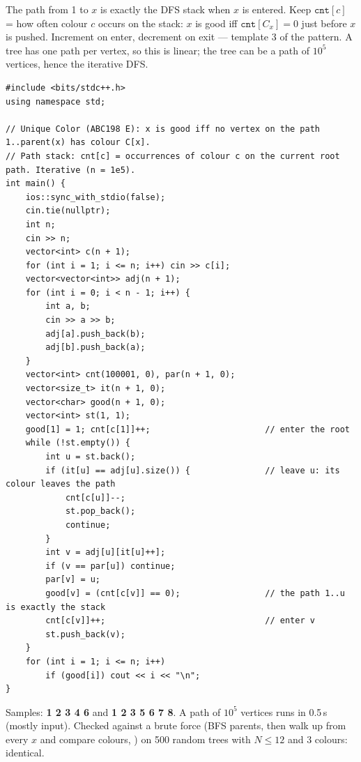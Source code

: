 \begin{solutionbox}
The path from 1 to $x$ is exactly the DFS stack when $x$ is entered. Keep $\texttt{cnt}[c]$ = how often colour $c$ occurs on the stack: $x$ is good iff $\texttt{cnt}[C_x] = 0$ just before $x$ is pushed. Increment on enter, decrement on exit --- template 3 of the pattern. A tree has one path per vertex, so this is linear; the tree can be a path of $10^5$ vertices, hence the iterative DFS.
\begin{lstlisting}[style=cpp]
#include <bits/stdc++.h>
using namespace std;

// Unique Color (ABC198 E): x is good iff no vertex on the path 1..parent(x) has colour C[x].
// Path stack: cnt[c] = occurrences of colour c on the current root path. Iterative (n = 1e5).
int main() {
    ios::sync_with_stdio(false);
    cin.tie(nullptr);
    int n;
    cin >> n;
    vector<int> c(n + 1);
    for (int i = 1; i <= n; i++) cin >> c[i];
    vector<vector<int>> adj(n + 1);
    for (int i = 0; i < n - 1; i++) {
        int a, b;
        cin >> a >> b;
        adj[a].push_back(b);
        adj[b].push_back(a);
    }
    vector<int> cnt(100001, 0), par(n + 1, 0);
    vector<size_t> it(n + 1, 0);
    vector<char> good(n + 1, 0);
    vector<int> st(1, 1);
    good[1] = 1; cnt[c[1]]++;                       // enter the root
    while (!st.empty()) {
        int u = st.back();
        if (it[u] == adj[u].size()) {               // leave u: its colour leaves the path
            cnt[c[u]]--;
            st.pop_back();
            continue;
        }
        int v = adj[u][it[u]++];
        if (v == par[u]) continue;
        par[v] = u;
        good[v] = (cnt[c[v]] == 0);                 // the path 1..u is exactly the stack
        cnt[c[v]]++;                                // enter v
        st.push_back(v);
    }
    for (int i = 1; i <= n; i++)
        if (good[i]) cout << i << "\n";
}
\end{lstlisting}
Samples: \textbf{1 2 3 4 6} and \textbf{1 2 3 5 6 7 8}. A path of $10^5$ vertices runs in 0.5\,s (mostly input). Checked against a brute force (BFS parents, then walk up from every $x$ and compare colours, ) on 500 random trees with $N \le 12$ and 3 colours: identical.
\end{solutionbox}

